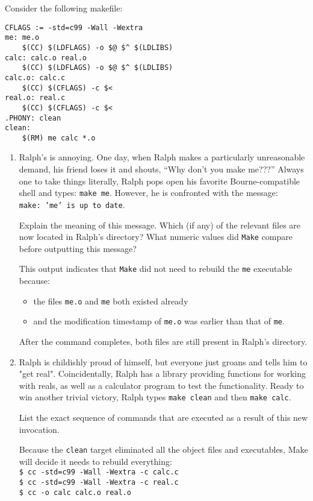 Consider the following makefile:
\begin{lstlisting}
CFLAGS := -std=c99 -Wall -Wextra
me: me.o
    $(CC) $(LDFLAGS) -o $@ $^ $(LDLIBS)
calc: calc.o real.o
	$(CC) $(LDFLAGS) -o $@ $^ $(LDLIBS)
calc.o: calc.c
	$(CC) $(CFLAGS) -c $<
real.o: real.c
	$(CC) $(CFLAGS) -c $<
.PHONY: clean
clean:
	$(RM) me calc *.o
\end{lstlisting}

\begin{enumerate}
\item
Ralph's is annoying.  One day, when Ralph makes a particularly unreasonable demand, his friend loses it and shouts, ``Why don't you make me???''
Always one to take things literally, Ralph pops open his favorite Bourne-compatible shell and types: \texttt{make me}.
However, he is confronted with the message: \texttt{make:\ 'me' is up to date}.

Explain the meaning of this message.  Which (if any) of the relevant files are now located in Ralph's directory?  What numeric values did \texttt{Make} compare before outputting this message?

\begin{answer}
This output indicates that \texttt{Make} did not need to rebuild the \texttt{me} executable because:
\begin{itemize}
	\item the files \texttt{me.o} and \texttt{me} both existed already
	\item and the modification timestamp of \texttt{me.o} was earlier than that of \texttt{me}.
\end{itemize}
After the command completes, both files are still present in Ralph's directory.
\end{answer}

\item
Ralph is childishly proud of himself, but everyone just groans and tells him to "get real".
Coincidentally, Ralph has a library providing functions for working with reals, as well as a calculator program to test the functionality.
Ready to win another trivial victory, Ralph types \texttt{make clean} and then \texttt{make calc}.

List the exact sequence of commands that are executed as a result of this new invocation.

\begin{answer}
Because the \texttt{clean} target eliminated all the object files and executables, Make will decide it needs to rebuild everything: \\
\texttt{\$ cc -std=c99 -Wall -Wextra -c calc.c} \\
\texttt{\$ cc -std=c99 -Wall -Wextra -c real.c} \\
\texttt{\$ cc -o calc calc.o real.o}
\end{answer}
\end{enumerate}
